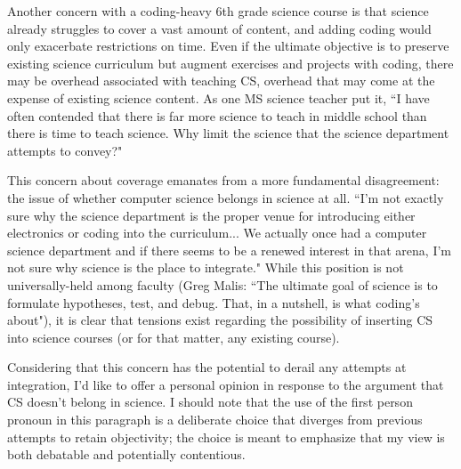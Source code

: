 Another concern with a coding-heavy 6th grade science course is that science already struggles to cover a vast amount of content, and adding coding would only exacerbate restrictions on time. Even if the ultimate objective is to preserve existing science curriculum but augment exercises and projects with coding, there may be overhead associated with teaching CS, overhead that may come at the expense of existing science content. As one MS science teacher put it, ``I have often contended that there is far more science to teach in middle school than there is time to teach science.  Why limit the science that the science department attempts to convey?" \par
This concern about coverage emanates from a more fundamental disagreement: the issue of whether computer science belongs in science at all. 
``I’m not exactly sure why the science department is the proper venue for introducing either electronics or coding into the curriculum... We actually once had a computer science department and if there seems to be a renewed interest in that arena, I’m not sure why science is the place to integrate." While this position is not universally-held among faculty (Greg Malis: ``The ultimate goal of science is to formulate hypotheses, test, and debug. That, in a nutshell, is what coding's about"), it is clear that tensions exist regarding the possibility of inserting CS into science courses (or for that matter, any existing course).\par
Considering that this concern has the potential to derail any attempts at integration, I'd like to offer a personal opinion in response to the argument that CS doesn't belong in science. I should note that the use of the first person pronoun in this paragraph is a deliberate choice that diverges from previous attempts to retain objectivity; the choice is meant to emphasize that my view is both debatable and potentially contentious.\par 
